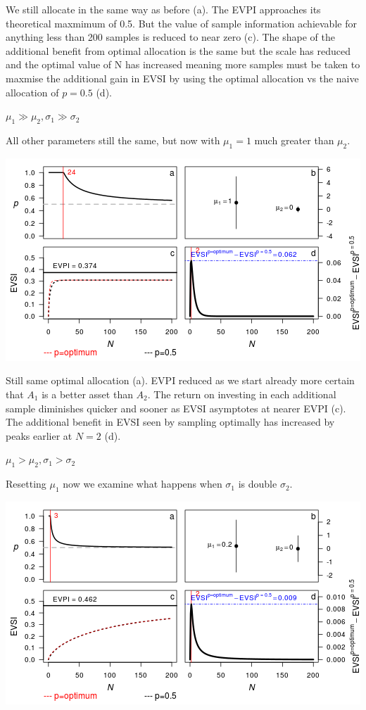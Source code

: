 \documentclass[]{article}
\theoremstyle{definition}
\theoremstyle{definition}
\theoremstyle{remark}
\begin{document}
We still allocate in the same way as before (a). The EVPI approaches its
theoretical maxmimum of 0.5. But the value of sample information
achievable for anything less than 200 samples is reduced to near zero
(c). The shape of the additional benefit from optimal allocation is the
same but the scale has reduced and the optimal value of N has increased
meaning more samples must be taken to maxmise the additional gain in
EVSI by using the optimal allocation vs the naive allocation of
\(p=0.5\) (d).

\textbf{\(\mu_1 \gg \mu_2, \sigma_1 \gg \sigma_2\)}

All other parameters still the same, but now with \(\mu_1=1\) much
greater than \(\mu_2\).

\includegraphics{figure/unnamed-chunk-4-1.png} \clearpage

Still same optimal allocation (a). EVPI reduced as we start already more
certain that \(A_1\) is a better asset than \(A_2\). The return on
investing in each additional sample diminishes quicker and sooner as
EVSI asymptotes at nearer EVPI (c). The additional benefit in EVSI seen
by sampling optimally has increased by peaks earlier at \(N=2\) (d).

\textbf{\(\mu_1 > \mu_2, \sigma_1 > \sigma_2\)}

Resetting \(\mu_1\) now we examine what happens when \(\sigma_1\) is
double \(\sigma_2\).

\includegraphics{figure/unnamed-chunk-5-1.png} \clearpage
\end{document}
